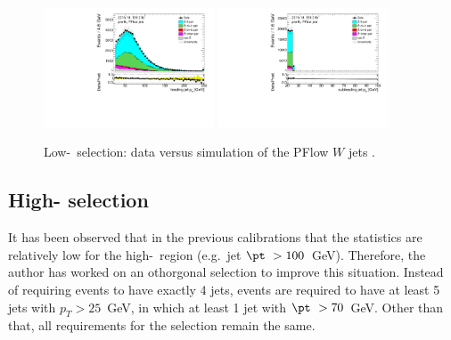\begin{figure}[H]
	\centering
	\includegraphics[width=0.45\textwidth]{FTAG_plots/pretagNoRwLowpTPFlowall/DataMC_h_J0_pt.pdf}
	\includegraphics[width=0.45\textwidth]{FTAG_plots/pretagNoRwLowpTPFlowall/DataMC_h_J1_pt.pdf}\\
	\caption{Low-\pt\ selection: data versus simulation of the 
	PFlow $W$ jets \pt. }
	\label{fig:kinematic_distributions_lowpT}
\end{figure}


\subsection{High-\texorpdfstring{\pt}{pT} selection}
\label{high_pt_selection}
It has been observed that in the previous calibrations that the statistics 
are relatively low for the high-\pt\ region (e.g.\ jet $\pt\ > 100$~GeV). 
Therefore, the author has worked on an othorgonal selection to improve this situation.
Instead of requiring events to have exactly 4 jets, events are required to 
have at least 5 jets with $p_{T} > 25$~GeV, in which at least 
1 jet with $\pt\ > 70$~GeV. Other than that, all 
requirements for the selection remain the same. 


